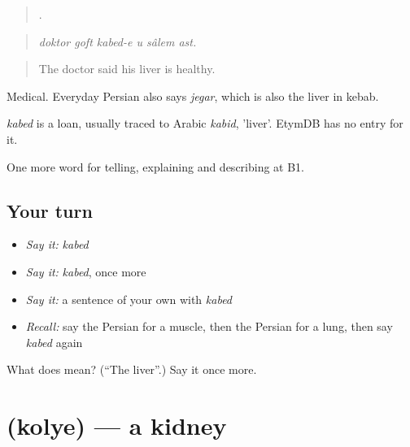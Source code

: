\begin{quote}
     .
\end{quote}

\begin{quote}
\emph{doktor goft kabed-e u sâlem ast.}
\end{quote}

\begin{quote}
The doctor said his liver is healthy.
\end{quote}

Medical. Everyday Persian also says \emph{jegar}, which is also the liver in kebab.

\begin{cousinweb}
\emph{kabed} is a loan, usually traced to Arabic \emph{kabid}, 'liver'. EtymDB has no entry for it.
\end{cousinweb}

\begin{grammarlens}[title={What you've built}]
One more word for telling, explaining and describing at B1.
\end{grammarlens}

\subsection*{Your turn}
\begin{itemize}
\raggedright
  \item \emph{Say it:} \emph{kabed}
  \item \emph{Say it:} \emph{kabed}, once more
  \item \emph{Say it:} a sentence of your own with \emph{kabed}
  \item \emph{Recall:} say the Persian for a muscle, then the Persian for a lung, then say \emph{kabed} again
\end{itemize}

\begin{tcolorbox}[breakable,colback=teal!4,colframe=teal!35!black,title={Before you move on}]
What does  mean? (\textquotedblleft{}The liver\textquotedblright{}.) Say it once more.
\end{tcolorbox}
\section[\texorpdfstring{\fa{کلیه} (kolye)}{کلیه (kolye)}]{ (kolye) — a kidney}

\label{lesson:FA-C495-kolye}



